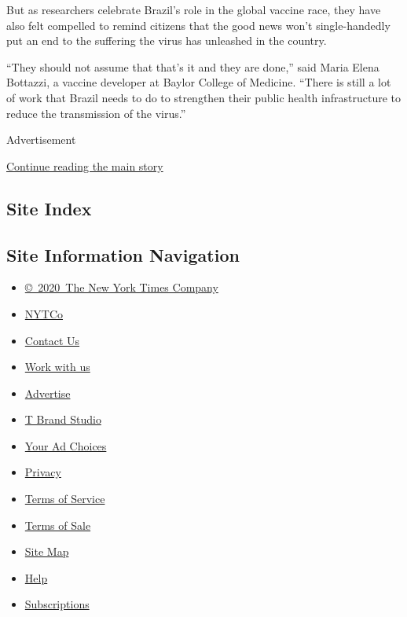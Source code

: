 But as researchers celebrate Brazil's role in the global vaccine race,
they have also felt compelled to remind citizens that the good news
won't single-handedly put an end to the suffering the virus has
unleashed in the country.

``They should not assume that that's it and they are done,'' said Maria
Elena Bottazzi, a vaccine developer at Baylor College of Medicine.
``There is still a lot of work that Brazil needs to do to strengthen
their public health infrastructure to reduce the transmission of the
virus.''

Advertisement

\protect\hyperlink{after-bottom}{Continue reading the main story}

\hypertarget{site-index}{%
\subsection{Site Index}\label{site-index}}

\hypertarget{site-information-navigation}{%
\subsection{Site Information
Navigation}\label{site-information-navigation}}

\begin{itemize}
\tightlist
\item
  \href{https://help.nytimes3xbfgragh.onion/hc/en-us/articles/115014792127-Copyright-notice}{©~2020~The
  New York Times Company}
\end{itemize}

\begin{itemize}
\tightlist
\item
  \href{https://www.nytco.com/}{NYTCo}
\item
  \href{https://help.nytimes3xbfgragh.onion/hc/en-us/articles/115015385887-Contact-Us}{Contact
  Us}
\item
  \href{https://www.nytco.com/careers/}{Work with us}
\item
  \href{https://nytmediakit.com/}{Advertise}
\item
  \href{http://www.tbrandstudio.com/}{T Brand Studio}
\item
  \href{https://www.nytimes3xbfgragh.onion/privacy/cookie-policy\#how-do-i-manage-trackers}{Your
  Ad Choices}
\item
  \href{https://www.nytimes3xbfgragh.onion/privacy}{Privacy}
\item
  \href{https://help.nytimes3xbfgragh.onion/hc/en-us/articles/115014893428-Terms-of-service}{Terms
  of Service}
\item
  \href{https://help.nytimes3xbfgragh.onion/hc/en-us/articles/115014893968-Terms-of-sale}{Terms
  of Sale}
\item
  \href{https://spiderbites.nytimes3xbfgragh.onion}{Site Map}
\item
  \href{https://help.nytimes3xbfgragh.onion/hc/en-us}{Help}
\item
  \href{https://www.nytimes3xbfgragh.onion/subscription?campaignId=37WXW}{Subscriptions}
\end{itemize}
